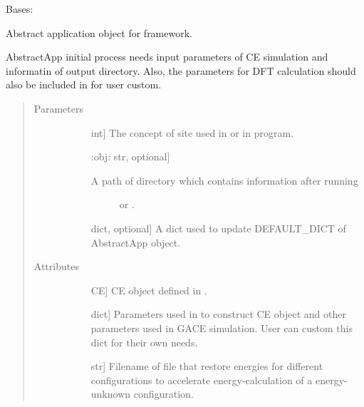 \documentclass[letterpaper,10pt,english]{sphinxmanual}
\begin{document}
\begin{fulllineitems}
\label{\detokenize{pygace:pygace.gace.AbstractApp}}
Bases: 

Abstract application object for  framework.

AbstractApp initial process needs input parameters of CE simulation
and informatin of output directory. Also, the parameters for DFT
calculation should also be included in  for
user custom.
\begin{quote}\begin{description}
\item[{Parameters}] \leavevmode\begin{description}
\item[{}] \leavevmode{[}int{]}
The concept of site used in  or  in 
program.

\item[{}] \leavevmode{[}:obj: str, optional{]}\begin{description}
\item[{A path of directory which contains information after running}] \leavevmode
{} or .

\end{description}

\item[{}] \leavevmode{[}dict, optional{]}
A dict used to update DEFAULT\_DICT of AbstractApp object.

\end{description}

\item[{Attributes}] \leavevmode\begin{description}
\item[{}] \leavevmode{[}CE{]}
CE object defined in .

\item[{}] \leavevmode{[}dict{]}
Parameters used in to construct CE object and other parameters used
in GACE simulation. User can custom this dict for their own needs.

\item[{}] \leavevmode{[}str{]}
Filename of file that restore energies for different configurations
to accelerate energy-calculation of a energy-unknown configuration.


\end{description}
\end{description}
\end{quote}
\end{fulllineitems}
\end{document}

